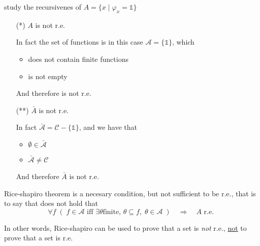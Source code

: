 \begin{exercise}
  study the recursivenes of $A = \{x \mid \varphi_x = \mathds{1}\}$

  \begin{enumerate}
  \item[(*)] $A$ is not r.e.

    In fact the set of functions is in this case
    $\mathcal{A} = \{\mathds{1}\}$, which
    \begin{itemize}
    \item does not contain finite functions
    \item is not empty
    \end{itemize}
    And therefore is not r.e.

  \item[(**)] $\bar{A}$ is not r.e.

    In fact $\bar{\mathcal{A}} = \mathcal{C} - \{\mathds{1}\}$, and we
    have that
    \begin{itemize}
    \item $\emptyset \in \bar{\mathcal{A}}$
    \item $\bar{\mathcal{A}} \neq \mathcal{C}$
    \end{itemize}
    And therefore $\bar{A}$ is not r.e.
  \end{enumerate}
\end{exercise}

\begin{observation}
  Rice-shapiro theorem is a necesary condition, but not sufficient to
  be r.e., that is to say that does not hold that
  \begin{equation}\label{eq:star}
    \forall f \; (\; f \in \mathcal{A} \mbox{ iff } \exists \theta \mbox{
      finite, } \theta \subseteq f, \; \theta \in \mathcal{A} \; ) \quad
    \Rightarrow \quad A \mbox{ r.e. }
  \end{equation}

  In other words, Rice-shapiro can be used to prove that a set is
  \emph{not} r.e., \underline{not} to prove that a set is r.e.
\end{observation}

